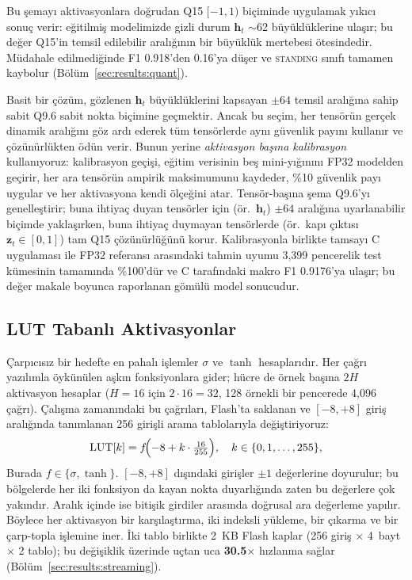 Bu şemayı aktivasyonlara doğrudan Q15 $[-1, 1)$ biçiminde
uygulamak yıkıcı sonuç verir: eğitilmiş modelimizde gizli durum
$\mathbf{h}_t$ $\sim$62 büyüklüklerine ulaşır; bu değer Q15'in
temsil edilebilir aralığının bir büyüklük mertebesi ötesindedir.
Müdahale edilmediğinde F1 0.918'den 0.16'ya düşer ve
\textsc{standing} sınıfı tamamen kaybolur
(Bölüm~\ref{sec:results:quant}).

Basit bir çözüm, gözlenen $\mathbf{h}_t$ büyüklüklerini kapsayan
$\pm 64$ temsil aralığına sahip sabit Q9.6 sabit nokta biçimine
geçmektir. Ancak bu seçim, her tensörün gerçek dinamik aralığını
göz ardı ederek tüm tensörlerde aynı güvenlik payını kullanır ve
çözünürlükten ödün verir. Bunun yerine \emph{aktivasyon başına
kalibrasyon} kullanıyoruz: kalibrasyon geçişi, eğitim
verisinin beş mini-yığınını FP32 modelden geçirir, her ara tensörün
ampirik maksimumunu kaydeder, \%10 güvenlik payı uygular ve her
aktivasyona kendi ölçeğini atar. Tensör-başına şema Q9.6'yı
genelleştirir; buna ihtiyaç duyan tensörler için (ör.\ $\mathbf{h}_t$)
$\pm 64$ aralığına uyarlanabilir biçimde yaklaşırken, buna ihtiyaç
duymayan tensörlerde (ör.\ kapı çıktısı
$\mathbf{z}_t \in [0,1]$) tam Q15 çözünürlüğünü korur.
Kalibrasyonla birlikte tamsayı C uygulaması ile FP32 referansı
arasındaki tahmin uyumu 3{,}399 pencerelik test kümesinin tamamında
\%100'dür ve C tarafındaki makro F1 0.9176'ya ulaşır; bu değer
makale boyunca raporlanan gömülü model sonucudur.

\subsection{LUT Tabanlı Aktivasyonlar}
\label{sec:method:lut}

Çarpıcısız bir hedefte en pahalı işlemler $\sigma$ ve $\tanh$
hesaplarıdır. Her çağrı yazılımla öykünülen aşkın fonksiyonlara
gider; hücre de örnek başına $2H$ aktivasyon hesaplar ($H{=}16$ için
$2 \cdot 16 = 32$, 128 örnekli bir pencerede 4{,}096 çağrı).
Çalışma zamanındaki bu çağrıları, Flash'ta saklanan ve $[-8, +8]$
giriş aralığında tanımlanan 256 girişli arama tablolarıyla
değiştiriyoruz:
\begin{equation}
\mathrm{LUT}[k]
  = f\!\Bigl( -8 + k \cdot \tfrac{16}{255} \Bigr), \quad
  k \in \{0, 1, \ldots, 255\},
\end{equation}
Burada $f \in \{\sigma, \tanh\}$. $[-8, +8]$ dışındaki girişler
$\pm 1$ değerlerine doyurulur; bu bölgelerde her iki fonksiyon da
kayan nokta duyarlığında zaten bu değerlere çok yakındır. Aralık
içinde ise bitişik girdiler arasında doğrusal ara değerleme yapılır.
Böylece her aktivasyon bir karşılaştırma, iki indeksli yükleme, bir
çıkarma ve bir çarp-topla işlemine iner. İki tablo birlikte 2~KB
Flash kaplar (256 giriş $\times$ 4~bayt $\times$ 2 tablo); bu
değişiklik \msp{} üzerinde uçtan uca
\textbf{30.5$\times$} hızlanma sağlar
(Bölüm~\ref{sec:results:streaming}).

